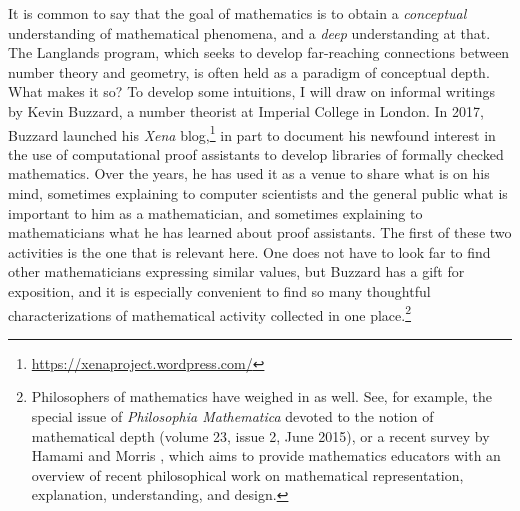 \documentclass{amsart}
\theoremstyle{definition}
\theoremstyle{remark}
\numberwithin{equation}{section}
\begin{document}
It is common to say that the goal of mathematics is to obtain a \emph{conceptual} understanding of mathematical phenomena, and a \emph{deep} understanding at that. The Langlands program, which seeks to develop far-reaching connections between number theory and geometry, is often held as a paradigm of conceptual depth. What makes it so? To develop some intuitions, I will draw on informal writings by Kevin Buzzard, a number theorist at Imperial College in London. In 2017, Buzzard launched his \emph{Xena} blog,\footnote{\url{https://xenaproject.wordpress.com/}} in part to document his newfound interest in the use of computational proof assistants to develop libraries of formally checked mathematics. Over the years, he has used it as a venue to share what is on his mind, sometimes explaining to computer scientists and the general public what is important to him as a mathematician, and sometimes explaining to mathematicians what he has learned about proof assistants. The first of these two activities is the one that is relevant here. One does not have to look far to find other mathematicians expressing similar values, but Buzzard has a gift for exposition, and it is especially convenient to find so many thoughtful characterizations of mathematical activity collected in one place.\footnote{Philosophers of mathematics have weighed in as well. See, for example, the special issue of \emph{Philosophia Mathematica} devoted to the notion of mathematical depth (volume 23, issue 2, June 2015), or a recent survey by Hamami and Morris \cite{hamami:morris:20}, which aims to provide mathematics educators with an overview of recent philosophical work on mathematical representation, explanation, understanding, and design.}
\end{document}
